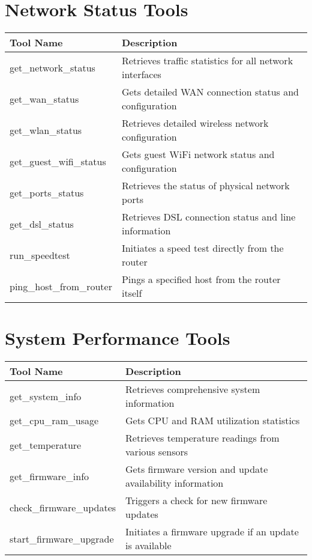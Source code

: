 \section*{Network Status Tools}
\begin{tabular}{|p{6cm}|p{9cm}|}
\hline
\textbf{Tool Name} & \textbf{Description} \\
\hline
get\_network\_status & Retrieves traffic statistics for all network interfaces \\
\hline
get\_wan\_status & Gets detailed WAN connection status and configuration \\
\hline
get\_wlan\_status & Retrieves detailed wireless network configuration \\
\hline
get\_guest\_wifi\_status & Gets guest WiFi network status and configuration \\
\hline
get\_ports\_status & Retrieves the status of physical network ports \\
\hline
get\_dsl\_status & Retrieves DSL connection status and line information \\
\hline
run\_speedtest & Initiates a speed test directly from the router \\
\hline
ping\_host\_from\_router & Pings a specified host from the router itself \\
\hline
\end{tabular}

\section*{System Performance Tools}
\begin{tabular}{|p{6cm}|p{9cm}|}
\hline
\textbf{Tool Name} & \textbf{Description} \\
\hline
get\_system\_info & Retrieves comprehensive system information \\
\hline
get\_cpu\_ram\_usage & Gets CPU and RAM utilization statistics \\
\hline
get\_temperature & Retrieves temperature readings from various sensors \\
\hline
get\_firmware\_info & Gets firmware version and update availability information \\
\hline
check\_firmware\_updates & Triggers a check for new firmware updates \\
\hline
start\_firmware\_upgrade & Initiates a firmware upgrade if an update is available \\
\hline
\end{tabular}

